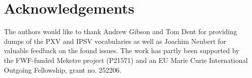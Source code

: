 \section{Acknowledgements}

The authors would like to thank Andrew Gibson and Tom Dent for providing dumps of the PXV and IPSV vocabularies as well as Joachim Neubert for valuable feedback on the found issues. The work has partly been supported by the FWF-funded Meketre project (P21571) and an EU Marie Curie International Outgoing Fellowship, grant no. 252206.
